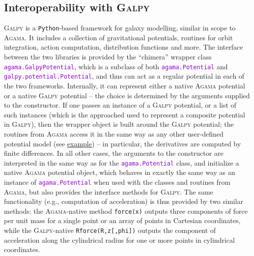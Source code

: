 \documentclass[12pt]{article}
\newcommand{\Agama}{\textsc{Agama}\xspace}
\newcommand{\Galpy}{\textsc{Galpy}\xspace}
\newcommand{\Python}{\texttt{Python}\xspace}
\newcommand{\ttt}[1]{\textcolor{darkviolet}{\texttt{#1}}}
\begin{document}
\subsection{Interoperability with \Galpy}  \label{sec:Galpy}

\Galpy \cite{Bovy2015} is a \Python-based framework for galaxy modelling, similar in scope to \Agama. It includes a collection of gravitational potentials, routines for orbit integration, action computation, distribution functions and more. 
The interface between the two libraries is provided by the ``chimera'' wrapper class \ttt{agama.GalpyPotential}, which is a subclass of both \ttt{agama.Potential} and \ttt{galpy.potential.Potential}, and thus can act as a regular potential in each of the two frameworks. Internally, it can represent either a native \Agama potential or a native \Galpy potential -- the choice is determined by the arguments supplied to the constructor. If one passes an instance of a \Galpy potential, or a list of such instances (which is the approached used to represent a composite potential in \Galpy), then the wrapper object is built around the \Galpy potential; the routines from \Agama access it in the same way as any other user-defined potential model (see \hyperref[sec:PythonPotential]{example}) -- in particular, the derivatives are computed by finite differences. In all other cases, the arguments to the constructor are interpreted in the same way as for the \ttt{agama.Potential} class, and initialize a native \Agama potential object, which behaves in exactly the same way as an instance of \ttt{agama.Potential} when used with the classes and routines from \Agama, but also provides the interface methods for \Galpy. The same functionality (e.g., computation of acceleration) is thus provided by two similar methods: the \Agama-native method \texttt{force(x)} outputs three components of force per unit mass for a single point or an array of points in Cartesian coordinates, while the \Galpy-native \texttt{Rforce(R,z[,phi])} outputs the component of acceleration along the cylindrical radius for one or more points in cylindrical coordinates.
\end{document}

